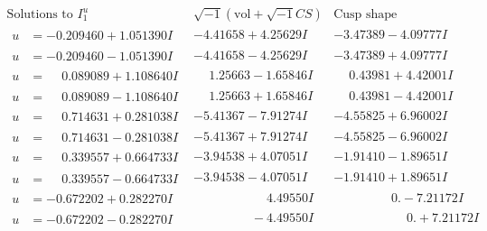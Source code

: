 \documentclass[1p]{elsarticle_modified}
\theoremstyle{definition}
\newcommand{\I}{\sqrt{-1}}
\begin{document}
$$\begin{array}{c|c|c}  
\text{Solutions to }I^u_{1}& \I (\text{vol} + \sqrt{-1}CS) & \text{Cusp shape}\\
 \hline 
\begin{aligned}
u &= -0.209460 + 1.051390 I\end{aligned}
 & -4.41658 + 4.25629 I & -3.47389 - 4.09777 I \\ \hline\begin{aligned}
u &= -0.209460 - 1.051390 I\end{aligned}
 & -4.41658 - 4.25629 I & -3.47389 + 4.09777 I \\ \hline\begin{aligned}
u &= \phantom{-}0.089089 + 1.108640 I\end{aligned}
 & \phantom{-}1.25663 - 1.65846 I & \phantom{-}0.43981 + 4.42001 I \\ \hline\begin{aligned}
u &= \phantom{-}0.089089 - 1.108640 I\end{aligned}
 & \phantom{-}1.25663 + 1.65846 I & \phantom{-}0.43981 - 4.42001 I \\ \hline\begin{aligned}
u &= \phantom{-}0.714631 + 0.281038 I\end{aligned}
 & -5.41367 - 7.91274 I & -4.55825 + 6.96002 I \\ \hline\begin{aligned}
u &= \phantom{-}0.714631 - 0.281038 I\end{aligned}
 & -5.41367 + 7.91274 I & -4.55825 - 6.96002 I \\ \hline\begin{aligned}
u &= \phantom{-}0.339557 + 0.664733 I\end{aligned}
 & -3.94538 + 4.07051 I & -1.91410 - 1.89651 I \\ \hline\begin{aligned}
u &= \phantom{-}0.339557 - 0.664733 I\end{aligned}
 & -3.94538 - 4.07051 I & -1.91410 + 1.89651 I \\ \hline\begin{aligned}
u &= -0.672202 + 0.282270 I\end{aligned}
 & \phantom{-0.000000 -}4.49550 I & \phantom{-0.000000 } 0. - 7.21172 I \\ \hline\begin{aligned}
u &= -0.672202 - 0.282270 I\end{aligned}
 & \phantom{-0.000000 } -4.49550 I & \phantom{-0.000000 -}0. + 7.21172 I \\ \hline\begin{aligned}

\end{aligned}
\end{array}$$
\end{document}
